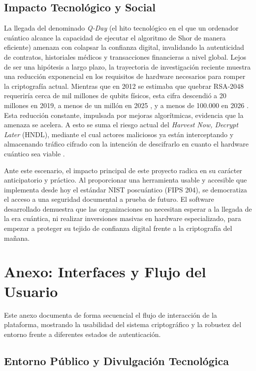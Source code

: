 \documentclass[11pt, a4paper]{report}
\theoremstyle{definition}
\begin{document}
\section{Impacto Tecnológico y Social}
\label{sec:impacto}


La llegada del denominado \textit{Q-Day} (el hito tecnológico en el que un ordenador cuántico alcance la capacidad de ejecutar el algoritmo de Shor de manera eficiente) amenaza con colapsar la confianza digital, invalidando la autenticidad de contratos, historiales médicos y transacciones financieras a nivel global. Lejos de ser una hipótesis a largo plazo, la trayectoria de investigación reciente muestra una reducción exponencial en los requisitos de hardware necesarios para romper la criptografía actual. Mientras que en 2012 se estimaba que quebrar RSA-2048 requeriría cerca de mil millones de qubits físicos, esta cifra descendió a 20 millones en 2019, a menos de un millón en 2025 \cite{google2025quantum}, y a menos de 100.000 en 2026 \cite{tqi2026qday}. Esta reducción constante, impulsada por mejoras algorítmicas, evidencia que la amenaza se acelera. A esto se suma el riesgo actual del \textit{Harvest Now, Decrypt Later} (HNDL), mediante el cual actores maliciosos ya están interceptando y almacenando tráfico cifrado con la intención de descifrarlo en cuanto el hardware cuántico sea viable \cite{ibm2025readiness}.

Ante este escenario, el impacto principal de este proyecto radica en su carácter anticipatorio y práctico. Al proporcionar una herramienta usable y accesible que implementa desde hoy el estándar NIST poscuántico (FIPS 204), se democratiza el acceso a una seguridad documental a prueba de futuro. El software desarrollado demuestra que las organizaciones no necesitan esperar a la llegada de la era cuántica, ni realizar inversiones masivas en hardware especializado, para empezar a proteger su tejido de confianza digital frente a la criptografía del mañana.

\chapter{Anexo: Interfaces y Flujo del Usuario}
\label{anexo:interfaces}

Este anexo documenta de forma secuencial el flujo de interacción de la plataforma, mostrando la usabilidad del sistema criptográfico y la robustez del entorno frente a diferentes estados de autenticación.

\section{Entorno Público y Divulgación Tecnológica}
\end{document}
